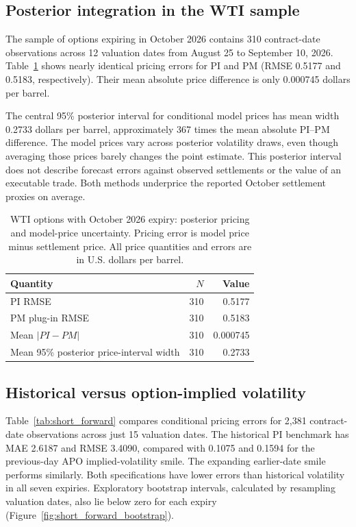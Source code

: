 \subsection{Posterior integration in the WTI sample}

The sample of options expiring in October 2026 contains 310 contract-date observations across 12 valuation dates from August 25 to September 10, 2026. Table~\ref{tab:short_october} shows nearly identical pricing errors for PI and PM (RMSE 0.5177 and 0.5183, respectively). Their mean absolute price difference is only 0.000745 dollars per barrel.

The central 95\% posterior interval for conditional model prices has mean width 0.2733 dollars per barrel, approximately 367 times the mean absolute PI--PM difference. The model prices vary across posterior volatility draws,
even though averaging those prices barely changes the point estimate.
This posterior interval does not describe forecast errors
against observed settlements or the value of an executable trade. Both methods underprice
the reported October settlement proxies on average.

\begin{table}[t]
\centering
\caption{WTI options with October 2026 expiry: posterior pricing and model-price uncertainty. Pricing error is model price minus settlement price. All price quantities and errors are in U.S. dollars per barrel.}\label{tab:short_october}
\begin{tabular}{lrr}
\toprule
Quantity & $N$ & Value \\
\midrule
PI RMSE & 310 & 0.5177 \\
PM plug-in RMSE & 310 & 0.5183 \\
Mean $|PI-PM|$ & 310 & 0.000745 \\
Mean 95\% posterior price-interval width & 310 & 0.2733 \\
\bottomrule
\end{tabular}
\end{table}

\subsection{Historical versus option-implied volatility}

Table~\ref{tab:short_forward} compares conditional pricing errors for 2,381 contract-date observations across just 15 valuation dates. The historical PI benchmark has MAE 2.6187 and RMSE 3.4090, compared with 0.1075 and 0.1594 for the previous-day APO implied-volatility smile. The expanding earlier-date smile performs similarly. Both specifications have lower errors than historical volatility in all seven expiries. Exploratory bootstrap intervals, calculated by resampling valuation dates, also lie below zero for each expiry (Figure~\ref{fig:short_forward_bootstrap}).

